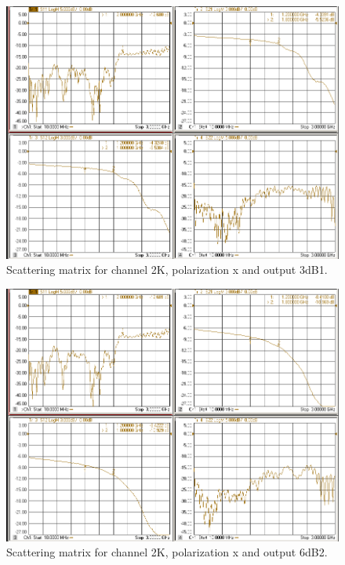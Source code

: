 \documentclass[12pt,a4paper,oneside]{article}
\begin{document}
\begin{figure}[H]
\centering
\includegraphics[width=0.9\linewidth]{VNA_results/2Kx_3dB1.png}
\caption{Scattering matrix for channel 2K, polarization x and output 3dB1.}
\label{fig:2Kx_3dB1}
\end{figure}


\begin{figure}[H]
\centering
\includegraphics[width=0.9\linewidth]{VNA_results/2Kx_6dB2.png}
\caption{Scattering matrix for channel 2K, polarization x and output 6dB2.}
\label{fig:2Kx_6dB2}
\end{figure}
\end{document}
